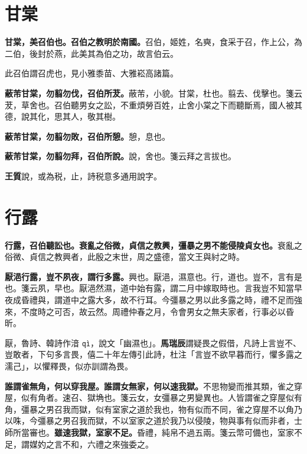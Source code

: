 \section{甘棠}


\textbf{甘棠，美召伯也。召伯之教明於南國。}{\footnotesize 召伯，姬姓，名奭，食采于召，作上公，為二伯，後封於燕，此美其為伯之功，故言伯云。}

\begin{quoting}此召伯謂召虎也，見小雅黍苗、大雅崧高諸篇。\end{quoting}

\textbf{蔽芾甘棠，勿翦勿伐，召伯所茇。}{\footnotesize 蔽芾，小貌。甘棠，杜也。翦去、伐擊也。箋云茇，草舍也。召伯聽男女之訟，不重煩勞百姓，止舍小棠之下而聽斷焉，國人被其德，說其化，思其人，敬其樹。}

\textbf{蔽芾甘棠，勿翦勿敗，召伯所憩。}{\footnotesize 憩，息也。}

\textbf{蔽芾甘棠，勿翦勿拜，召伯所說。}{\footnotesize 說，舍也。箋云拜之言拔也。}

\begin{quoting}\textbf{王質}說，或為税，止，詩税意多通用說字。\end{quoting}

\section{行露}


\textbf{行露，召伯聽訟也。衰亂之俗微，貞信之教興，彊暴之男不能侵陵貞女也。}{\footnotesize 衰亂之俗微、貞信之教興者，此殷之末世，周之盛德，當文王與紂之時。}

\textbf{厭浥行露，豈不夙夜，謂行多露。}{\footnotesize 興也。厭浥，濕意也。行，道也。豈不，言有是也。箋云夙，早也。厭浥然濕，道中始有露，謂二月中嫁取時也。言我豈不知當早夜成昏禮與，謂道中之露大多，故不行耳。今彊暴之男以此多露之時，禮不足而強來，不度時之可否，故云然。周禮仲春之月，令會男女之無夫家者，行事必以昏昕。}

\begin{quoting}厭，魯詩、韓詩作湆 \texttt{qì}，說文「幽濕也」。\textbf{馬瑞辰}謂疑畏之假借，凡詩上言豈不、豈敢者，下句多言畏，僖二十年左傳引此詩，杜注「言豈不欲早暮而行，懼多露之濡己」，以懼釋畏，似亦訓謂為畏。\end{quoting}

\textbf{誰謂雀無角，何以穿我屋。誰謂女無家，何以速我獄。}{\footnotesize 不思物變而推其類，雀之穿屋，似有角者。速召、獄埆也。箋云女，女彊暴之男變異也。人皆謂雀之穿屋似有角，彊暴之男召我而獄，似有室家之道於我也，物有似而不同，雀之穿屋不以角乃以咮，今彊暴之男召我而獄，不以室家之道於我乃以侵陵，物與事有似而非者，士師所當審也。}\textbf{雖速我獄，室家不足。}{\footnotesize 昏禮，純帛不過五兩。箋云幣可備也，室家不足，謂媒妁之言不和，六禮之來強委之。}

